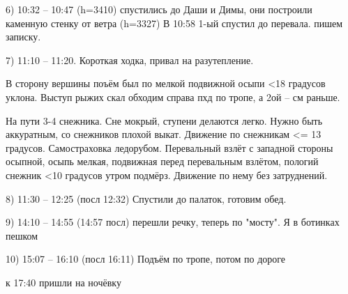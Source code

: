 6) 10:32 -- 10:47 (h=3410) спустились до Даши и Димы, они построили каменную стенку от ветра (h=3327) В 10:58 1-ый спустил до перевала. пишем записку.

7) 11:10 -- 11:20. Короткая ходка, привал на разутепление.

В сторону вершины поъём был по мелкой подвижной осыпи <18 градусов уклона. Выступ рыжих скал обходим справа пхд по тропе, а 2ой -- см раньше.

На пути 3-4 снежника. Сне мокрый, ступени делаются легко. Нужно быть аккуратным, со снежников плохой выкат. Движение по снежникам <= 13 градусов. Самостраховка ледорубом. Перевальный взлёт с западной стороны осыпной, осыпь мелкая, подвижная перед перевальным взлётом, пологий снежник <10 градусов утром подмёрз. Движение по нему без затруднений.

8) 11:30 -- 12:25 (посл 12:32) Спустили до палаток, готовим обед.

9) 14:10 -- 14:55 (14:57 посл) перешли речку, теперь по "мосту". Я в ботинках пешком

10) 15:07 -- 16:10 (посл 16:11) Подъём по тропе, потом по дороге

к 17:40 пришли на ночёвку


    \FloatBarrier
